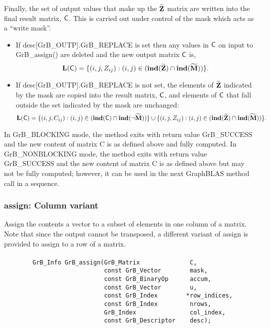 Finally, the set of output values that make up the ${\bf \widetilde{Z}}$ 
matrix are written into the final result matrix, ${\sf C}$. 
This is carried out under control of the mask which acts as a ``write mask''.
\begin{itemize}
\item If {\sf desc[GrB\_OUTP].GrB\_REPLACE} is set then any values in ${\sf C}$ 
on input to {\sf GrB\_assign()} are deleted and the new output matrix ${\sf C}$ is,
		\[ \bold{L}({\sf C}) = \{(i,j,Z_{ij}) : (i,j) \in (\bold{ind}({\bf \widetilde{Z}}) 
\cap \bold{ind}({\bf \widetilde{M}})) \}. \]

\item If {\sf desc[GrB\_OUTP].GrB\_REPLACE} is not set, the elements of 
${\bf \widetilde{Z}}$ indicated by 
the mask are copied into the result matrix, ${\sf C}$, and elements of 
${\sf C}$ that fall outside the set indicated by the mask are unchanged:
		\[ \bold{L}({\sf C}) = \{(i,j,C_{ij}) : (i,j) \in (\bold{ind}({\bf \sf C}) 
		\cap \bold{ind}(\neg {\bf \widetilde{M}})) \} \cup \{(i,j,Z_{ij}) : (i,j) \in 
(\bold{ind}({\bf \widetilde{Z}}) \cap \bold{ind}({\bf \widetilde{M}})) \}. \]
\end{itemize}

In {\sf GrB\_BLOCKING} mode, the method exits with return value 
{\sf GrB\_SUCCESS} and the new content of matrix {\sf C} is as defined above
and fully computed.  
In {\sf GrB\_NONBLOCKING} mode, the method exits with return value 
{\sf GrB\_SUCCESS} and the new content of matrix {\sf C} is as defined above 
but may not be fully computed; however, it can be used in the next GraphBLAS 
method call in a sequence.

\subsubsection{{\sf assign}: Column variant}

Assign the contents a vector to a subset of elements in one column of a matrix. 
Note that since the output cannot be transposed, a different variant of
{\sf assign} is provided to assign to a row of a matrix.

\paragraph{\syntax}

\begin{verbatim}
        GrB_Info GrB_assign(GrB_Matrix              C,
                            const GrB_Vector        mask,
                            const GrB_BinaryOp      accum,
                            const GrB_Vector        u,
                            const GrB_Index        *row_indices,
                            const GrB_Index         nrows,
                            GrB_Index               col_index,
                            const GrB_Descriptor    desc); 
\end{verbatim}

